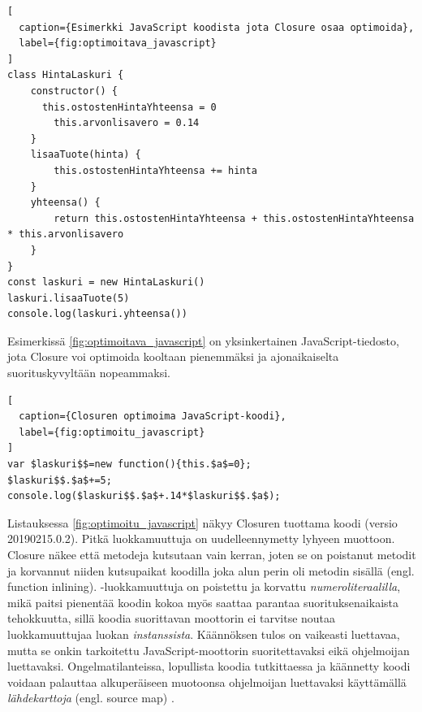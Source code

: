 \begin{lstlisting}[
  caption={Esimerkki JavaScript koodista jota Closure osaa optimoida},
  label={fig:optimoitava_javascript}
]
class HintaLaskuri {
	constructor() {
	  this.ostostenHintaYhteensa = 0
		this.arvonlisavero = 0.14
	}
	lisaaTuote(hinta) {
		this.ostostenHintaYhteensa += hinta
	}
	yhteensa() {
		return this.ostostenHintaYhteensa + this.ostostenHintaYhteensa * this.arvonlisavero
	}
}
const laskuri = new HintaLaskuri()
laskuri.lisaaTuote(5)
console.log(laskuri.yhteensa())
\end{lstlisting}
Esimerkissä \ref{fig:optimoitava_javascript} on yksinkertainen
JavaScript-tiedosto, jota Closure voi optimoida kooltaan pienemmäksi
ja ajonaikaiselta suorituskyvyltään nopeammaksi.
\begin{lstlisting}[
  caption={Closuren optimoima JavaScript-koodi},
  label={fig:optimoitu_javascript}
]
var $laskuri$$=new function(){this.$a$=0};
$laskuri$$.$a$+=5;
console.log($laskuri$$.$a$+.14*$laskuri$$.$a$);
\end{lstlisting}
Listauksessa \ref{fig:optimoitu_javascript} näkyy Closuren
tuottama koodi (versio 20190215.0.2). Pitkä luokkamuuttuja\newline
{} on uudelleennymetty lyhyeen muottoon.
Closure näkee että metodeja kutsutaan vain kerran, joten se on poistanut
metodit ja korvannut niiden kutsupaikat koodilla joka alun perin oli metodin
sisällä (engl. function inlining).\newline
{}-luokkamuuttuja
on poistettu ja korvattu  \textit{numeroliteraalilla},
mikä paitsi pienentää koodin kokoa myös saattaa parantaa suorituksenaikaista
tehokkuutta, sillä koodia suorittavan moottorin ei
tarvitse noutaa 
luokkamuuttujaa luokan \textit{instanssista}. Käännöksen tulos on vaikeasti
luettavaa, mutta se onkin tarkoitettu JavaScript-moottorin suoritettavaksi
eikä ohjelmoijan luettavaksi. Ongelmatilanteissa, lopullista koodia
tutkittaessa ja  käännetty koodi voidaan palauttaa
alkuperäiseen muotoonsa ohjelmoijan luettavaksi käyttämällä \textit{lähdekarttoja}
(engl. source map) \cite{SourceMapMDN, SourceMapsDocsClosure}.

